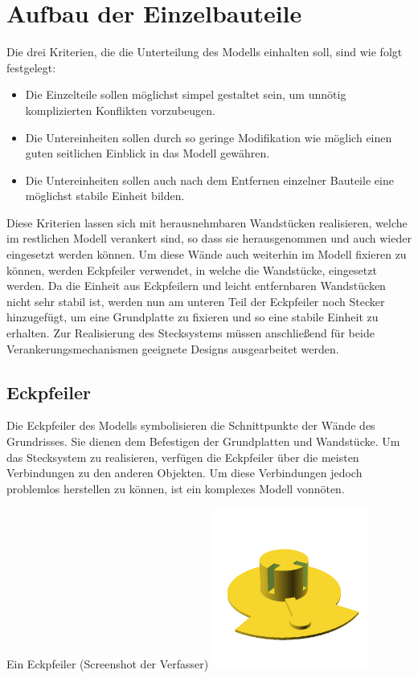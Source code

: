 \section{Aufbau der Einzelbauteile}
Die drei Kriterien, die die Unterteilung des Modells einhalten soll, sind wie folgt festgelegt:

\begin{itemize}
	\item Die Einzelteile sollen möglichst simpel gestaltet sein, um unnötig komplizierten Konflikten vorzubeugen.                      %
	\item Die Untereinheiten sollen durch so geringe Modifikation wie möglich einen guten seitlichen Einblick in das Modell gewähren.
	\item Die Untereinheiten sollen auch nach dem Entfernen einzelner Bauteile eine möglichst stabile Einheit bilden.
\end{itemize}

Diese Kriterien lassen sich mit herausnehmbaren Wandstücken realisieren, welche im restlichen Modell verankert sind, so dass sie herausgenommen und auch wieder eingesetzt werden können.
Um diese Wände auch weiterhin im Modell fixieren zu können, werden Eckpfeiler verwendet, in welche die Wandstücke, eingesetzt werden.
Da die Einheit aus Eckpfeilern und leicht entfernbaren Wandstücken nicht sehr stabil ist, werden nun am unteren Teil der Eckpfeiler noch Stecker hinzugefügt, um eine Grundplatte zu fixieren und so eine stabile Einheit zu erhalten.
Zur Realisierung des Stecksystems müssen anschließend für beide Verankerungsmechanismen geeignete Designs ausgearbeitet werden.\\

\subsection{Eckpfeiler}
Die Eckpfeiler des Modells symbolisieren die Schnittpunkte der Wände des Grundrisses.
Sie dienen dem Befestigen der Grundplatten und Wandstücke.
Um das Stecksystem zu realisieren, verfügen die Eckpfeiler über die meisten Verbindungen zu den anderen Objekten.
Um diese Verbindungen jedoch problemlos herstellen zu können, ist ein komplexes Modell vonnöten.
\begin{Bild}{Ein Eckpfeiler (Screenshot der Verfasser)}
	\includegraphics[height=200px]{Bilder/Untereinheit_Ecke}
\end{Bild}


